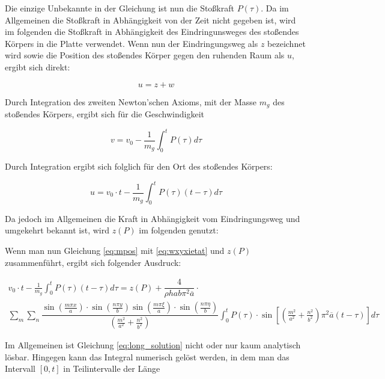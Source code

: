 Die einzige Unbekannte in der Gleichung ist nun die Stoßkraft $P(\tau)$. Da im Allgemeinen die Stoßkraft in Abhängigkeit von der Zeit nicht gegeben ist, wird im folgenden die Stoßkraft in Abhängigkeit des Eindringunsweges des stoßendes Körpers in die Platte verwendet. Wenn nun der Eindringungsweg als $z$ bezeichnet wird sowie die Position des stoßendes Körper gegen den ruhenden Raum als $u$, ergibt sich direkt:

\begin{equation}
	u = z + w
\end{equation}


Durch Integration des zweiten Newton'schen Axioms, mit der Masse $m_g$ des stoßendes Körpers, ergibt sich für die Geschwindigkeit 

\begin{equation}
	v = v_0 - \frac{1}{m_g} \int_0^t P(\tau) d\tau
\end{equation}

Durch Integration ergibt sich folglich für den Ort des stoßendes Körpers:

\begin{equation}
	u = v_0 \cdot t - \frac{1}{m_g} \int_0^t P(\tau) (t-\tau) d\tau
	\label{eq:mpos}
\end{equation}


Da jedoch im Allgemeinen die Kraft in Abhängigkeit vom Eindringungsweg und umgekehrt bekannt ist, wird $z(P)$ im folgenden genutzt:

Wenn man nun Gleichung \ref{eq:mpos} mit \ref{eq:wxyxietat} und $z(P)$ zusammenführt, ergibt sich folgender Ausdruck:


\begin{multline}
v_0 \cdot t - \frac{1}{m_g} \int_0^t P(\tau) (t-\tau) d\tau = z(P) + \dfrac{4}{\rho h a b \pi^2 \overline{a}} \cdot  \\  \sum_m \sum_n 
\dfrac{{\sin\left(\frac{m \pi x}{a}\right) \cdot \sin\left(\frac{n \pi y}{b}\right) \sin\left(\frac{m \pi \xi}{a}\right) \cdot \sin\left(\frac{n \pi \eta}{b}\right)	}}{\left(\frac{m^2}{a^2} + \frac{n^2}{b^2} \right)} 
\int_0^t
P(\tau)\cdot \sin \left[ \left(\frac{m^2}{a^2} + \frac{n^2}{b^2} \right) \pi^2 \overline{a} (t-\tau)\right] d\tau
\label{eq:long_solution}
\end{multline}

Im Allgemeinen ist Gleichung \ref{eq:long_solution} nicht oder nur kaum analytisch lösbar. Hingegen kann das Integral numerisch gelöst werden, in dem man das Intervall $\left[ 0,t \right]$ in Teilintervalle der Länge

